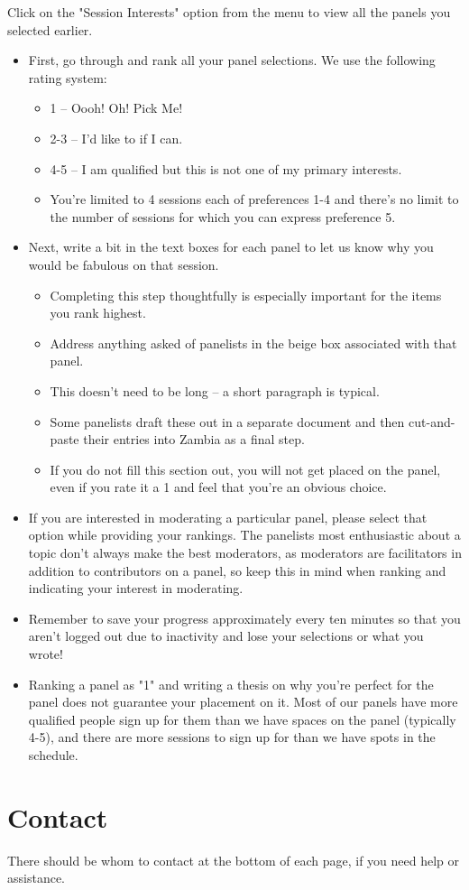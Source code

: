 \documentclass[captions=tablesignature]{scrartcl}
\begin{document}
Click on the "Session Interests" option from the menu to view all
the panels you selected earlier.
\begin{itemize}
\item First, go through and rank all your panel selections. We use the
following rating system:
\begin{itemize}
\item 1 -- Oooh! Oh! Pick Me!
\item 2-3 -- I'd like to if I can.
\item 4-5 -- I am qualified but this is not one of my primary
interests.
\item You’re limited to 4 sessions each of preferences 1-4 and there’s
no limit to the number of sessions for which you can express
preference 5.
\end{itemize}
\item Next, write a bit in the text boxes for each panel to let us know
why you would be fabulous on that session.
\begin{itemize}
\item Completing this step thoughtfully is especially important for
the items you rank highest.
\item Address anything asked of panelists in the beige box associated
with that panel.
\item This doesn’t need to be long -- a short paragraph is typical.
\item Some panelists draft these out in a separate document and then
cut-and-paste their entries into Zambia as a final step.
\item If you do not fill this section out, you will not get placed on
the panel, even if you rate it a 1 and feel that you’re an
obvious choice.
\end{itemize}
\item If you are interested in moderating a particular panel, please
select that option while providing your rankings.  The panelists
most enthusiastic about a topic don’t always make the best
moderators, as moderators are facilitators in addition to
contributors on a panel, so keep this in mind when ranking and
indicating your interest in moderating.
\item Remember to save your progress approximately every ten minutes so
that you aren’t logged out due to inactivity and lose your
selections or what you wrote!
\item Ranking a panel as "1" and writing a thesis on why you’re perfect
for the panel does not guarantee your placement on it. Most of our
panels have more qualified people sign up for them than we have
spaces on the panel (typically 4-5), and there are more sessions
to sign up for than we have spots in the schedule.
\end{itemize}

\section{Contact}
\label{sec-7}
There should be whom to contact at the bottom of each page, if you
need help or assistance.
\end{document}

